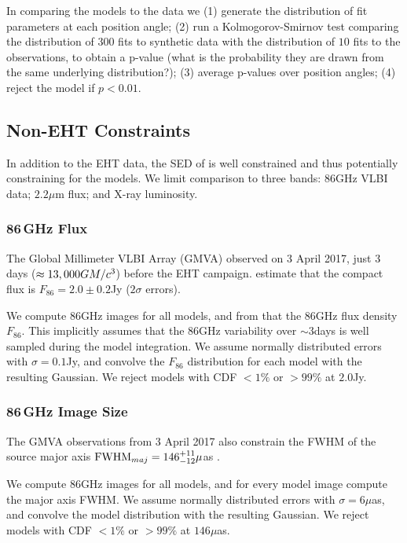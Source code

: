 In comparing the models to the data we (1) generate the distribution of fit parameters at each position angle; (2) run a Kolmogorov-Smirnov test comparing the distribution of $300$ fits to synthetic data with the distribution of $10$ fits to the observations, to obtain a p-value (what is the probability they are drawn from the same underlying distribution?); (3) average p-values over position angles; (4) reject the model if $p < 0.01$.

\subsection{Non-EHT Constraints}

In addition to the EHT data, the SED of \sgra is well constrained  and thus potentially constraining for the models.  We limit comparison to three bands: 86GHz VLBI data; $2.2\mu$m flux; and X-ray luminosity.

\subsubsection{86\,GHz Flux}

The Global Millimeter VLBI Array (GMVA) observed \sgra on 3 April 2017, just 3 days ($\approx 13,000 GM/c^3$) before the EHT campaign.  \cite{2019ApJ...871...30I} estimate that the compact flux is $F_{86}=2.0 \pm 0.2$Jy ($2\sigma$ errors).

We compute 86GHz images for all models, and from that the 86GHz flux density $F_{86}$.  This implicitly assumes that the 86GHz variability over $\sim 3$days is well sampled during the model integration.  We assume normally distributed errors with $\sigma = 0.1$Jy, and convolve the $F_{86}$ distribution for each model with the resulting Gaussian.  We reject models with CDF $< 1\%$ or $> 99\%$ at $2.0$Jy.

\subsubsection{86\,GHz Image Size}

The GMVA observations from 3 April 2017 also constrain the FWHM of the source major axis ${\rm FWHM}_{maj} = 146^{+11}_{-12}\mu$as \citep[95\% confidence][]{2021ApJ...915...99I}.

We compute 86GHz images for all models, and for every model image compute the major axis FWHM.  We assume normally distributed errors with $\sigma = 6\mu$as, and convolve the model distribution with the resulting Gaussian.  We reject models with CDF $< 1\%$ or $> 99\%$ at $146\mu$as.


